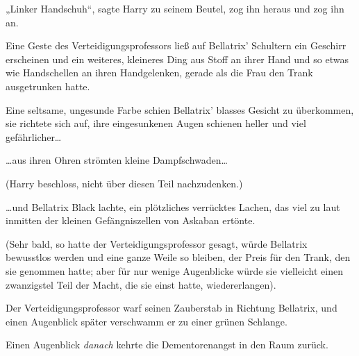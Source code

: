 „Linker Handschuh“, sagte Harry zu seinem Beutel, zog ihn heraus und zog ihn an.

Eine Geste des Verteidigungsprofessors ließ auf Bellatrix' Schultern ein Geschirr erscheinen und ein weiteres, kleineres Ding aus Stoff an ihrer Hand und so etwas wie Handschellen an ihren Handgelenken, gerade als die Frau den Trank ausgetrunken hatte.

Eine seltsame, ungesunde Farbe schien Bellatrix' blasses Gesicht zu überkommen, sie richtete sich auf, ihre eingesunkenen Augen schienen heller und viel gefährlicher…

…aus ihren Ohren strömten kleine Dampfschwaden…

(Harry beschloss, nicht über diesen Teil nachzudenken.)

…und Bellatrix Black lachte, ein plötzliches verrücktes Lachen, das viel zu laut inmitten der kleinen Gefängniszellen von Askaban ertönte.

(Sehr bald, so hatte der Verteidigungsprofessor gesagt, würde Bellatrix bewusstlos werden und eine ganze Weile so bleiben, der Preis für den Trank, den sie genommen hatte; aber für nur wenige Augenblicke würde sie vielleicht einen zwanzigstel Teil der Macht, die sie einst hatte, wiedererlangen).

Der Verteidigungsprofessor warf seinen Zauberstab in Richtung Bellatrix, und einen Augenblick später verschwamm er zu einer grünen Schlange.

Einen Augenblick \emph{danach} kehrte die Dementorenangst in den Raum zurück.

